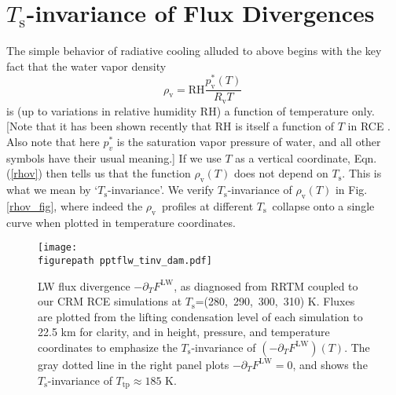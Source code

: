 \documentclass[9pt,twocolumn,twoside,lineno]{pnas-new}
\newcommand{\beqn}{\begin{equation}}
\newcommand{\eeqn}{\end{equation}}
\newcommand{\eqnref}[1]{(\ref{#1})}
\newcommand{\ppt}{\ensuremath{\partial_T}}
\newcommand{\FLW}{\ensuremath{F^\mathrm{LW}}}
\newcommand{\rhov}{\ensuremath{\rho_\mathrm{v}}}
\newcommand{\Rv}{\ensuremath{R_\mathrm{v}}}
\newcommand{\pvstar}{\ensuremath{p^*_{\mathrm{v}}}}
\newcommand{\Ts}{\ensuremath{T_\mathrm{s}}}
\newcommand{\RH}{\ensuremath{\mathrm{RH}}}
\newcommand{\Ttp}{\ensuremath{T_\mathrm{tp}}}
\newcommand{\figurepath}{./}
\begin{document}
\section{\Ts-invariance of Flux Divergences}
\label{Ts_invariance}
The simple behavior of radiative cooling alluded to above begins with the key fact that  the water vapor density 
	\beqn
		\rhov =  \RH\frac{\pvstar(T)}{\Rv T} \; 
	\label{rhov}
	\eeqn
	 is (up to variations in relative humidity \RH) a function of temperature only. [Note that it has been shown recently that RH is itself a function of $T$ in RCE \cite{romps2014}. Also note that here $p_v^*$  is the saturation vapor pressure of water, and all other symbols have their usual meaning.] If we use $T$ as a vertical coordinate,  Eqn. \eqnref{rhov} then tells us that the function $\rhov(T)$ does not depend on \Ts. This is what we mean by `\Ts-invariance'. We verify \Ts-invariance of $\rhov(T)$  in Fig. \ref{rhov_fig}, where indeed  the \rhov\ profiles at different \Ts\ collapse onto a single curve when plotted in temperature coordinates.


\begin{figure}[t]
	\begin{center}
			\texttt{[image: \\figurepath pptflw\_tinv\_dam.pdf]}
		\caption{LW flux divergence  $-\ppt \FLW$, as diagnosed from RRTM coupled to our CRM RCE simulations at \Ts=(280,\ 290,\ 300,\ 310) K. Fluxes are plotted from the lifting condensation level of each simulation to 22.5 km for clarity, and  in height, pressure, and temperature coordinates to emphasize the \Ts-invariance of  $(-\ppt \FLW)(T)$. The gray dotted line in the right panel plots $-\ppt \FLW = 0$, and shows the \Ts-invariance of $\Ttp \approx 185$ K.
		\label{pptflw_tinv_dam}
		}
	\end{center}
\end{figure}
\end{document}
